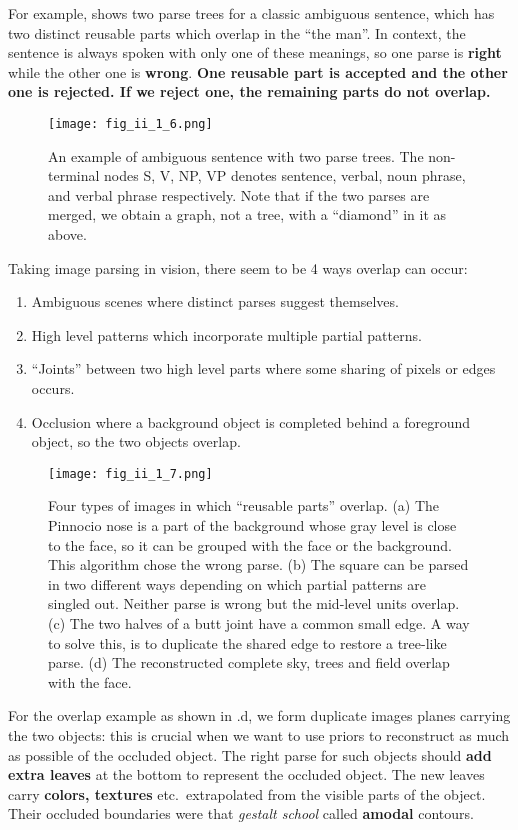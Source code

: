 \documentclass[../Notes_of_CaRiVaC.tex]{subfiles}
\begin{document}
For example,  shows two parse trees for a classic ambiguous
sentence, which has two distinct reusable parts which overlap in the
``the man''. In context, the sentence is always spoken with only one of these
meanings, so one parse is \textbf{right} while the other one is \textbf{wrong}.
\textbf{One reusable part is accepted and the other one is rejected. If we
reject one, the remaining parts do not overlap.}
%
\begin{figure}[!htpb]
  \centering
  \texttt{[image: fig\_ii\_1\_6.png]}
  \caption{An example of ambiguous sentence with two parse trees. The
    non-terminal nodes S, V, NP, VP denotes sentence, verbal, noun phrase, and
    verbal phrase respectively. Note that if the two parses are merged, we
    obtain a graph, not a tree, with a ``diamond'' in it as above.}%
  \label{fig:ii.1.6}
\end{figure}
%

Taking image parsing in vision, there seem to be 4 ways overlap can occur:
%
\begin{enumerate}
  \item Ambiguous scenes where distinct parses suggest themselves.
  \item High level patterns which incorporate multiple partial patterns.
  \item ``Joints'' between two high level parts where some sharing of pixels or
    edges occurs.
  \item Occlusion where a background object is completed behind a foreground
    object, so the two objects overlap.
\end{enumerate}
%
\pagebreak
%
\begin{figure}[!htpb]
  \centering
  \texttt{[image: fig\_ii\_1\_7.png]}
  \caption{Four types of images in which ``reusable parts'' overlap. (a) The
    Pinnocio nose is a part of the background whose gray level is close to the
    face, so it can be grouped with the face or the background. This algorithm
    chose the wrong parse. (b) The square can be parsed in two different ways
    depending on which partial patterns are singled out. Neither parse is wrong
    but the mid-level units overlap. (c) The two halves of a butt joint have a
    common small edge. A way to solve this, is to duplicate the shared edge to
    restore a tree-like parse. (d) The reconstructed complete sky, trees and
    field overlap with the face.}%
  \label{fig:ii.1.7}
\end{figure}
%
For the overlap example as shown in .d, we form duplicate images
planes carrying the two objects: this is crucial when we want to use priors to
reconstruct as much as possible of the occluded object. The right parse for
such objects should \textbf{add extra leaves} at the bottom to represent the
occluded object. The new  leaves carry \textbf{colors, textures} etc.\,
extrapolated from the visible parts of the object. Their occluded boundaries
were that \textit{gestalt school} called \textbf{amodal} contours.
\end{document}
